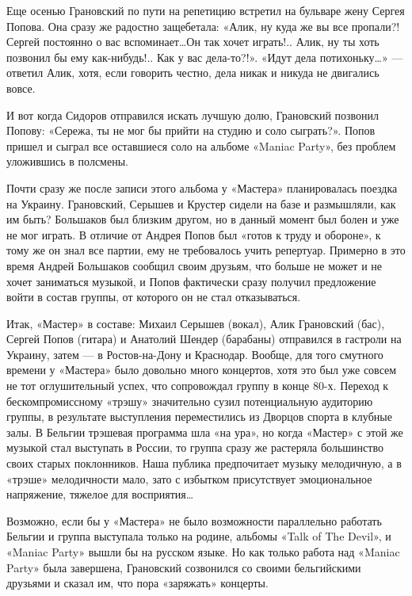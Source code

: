 \documentclass[16pt,a5paper]{book}
\begin{document}
Еще осенью Грановский по пути на репетицию встретил на бульваре жену Сергея Попова. Она сразу же радостно защебетала:
«Алик, ну куда же вы все пропали?! Сергей постоянно о вас вспоминает\ldots Он так хочет играть!.. Алик, ну ты хоть
позвонил бы ему как-нибудь!.. Как у вас дела-то?!». «Идут дела потихоньку\ldots» — ответил Алик, хотя, если говорить
честно, дела никак и никуда не двигались вовсе.

И вот когда Сидоров отправился искать лучшую долю, Грановский позвонил Попову: «Сережа, ты не мог бы прийти на студию и
соло сыграть?». Попов пришел и сыграл все оставшиеся соло на альбоме «Maniac Party», без проблем уложившись в полсмены.

Почти сразу же после записи этого альбома у «Мастера» планировалась поездка на Украину. Грановский, Серышев и Крустер
сидели на базе и размышляли, как им быть? Большаков был близким другом, но в данный момент был болен и уже не мог
играть. В отличие от Андрея Попов был «готов к труду и обороне», к тому же он знал все партии, ему не требовалось учить
репертуар. Примерно в это время Андрей Большаков сообщил своим друзьям, что больше не может и не хочет заниматься
музыкой, и Попов фактически сразу получил предложение войти в состав группы, от которого он не стал отказываться.

Итак, «Мастер» в составе: Михаил Серышев (вокал), Алик Грановский (бас), Сергей Попов (гитара) и Анатолий Шендер
(барабаны) отправился в гастроли на Украину, затем — в Ростов-на-Дону и Краснодар. Вообще, для того смутного времени у
«Мастера» было довольно много концертов, хотя это был уже совсем не тот оглушительный успех, что сопровождал группу в
конце 80-х. Переход к бескомпромиссному «трэшу» значительно сузил потенциальную аудиторию группы, в результате
выступления переместились из Дворцов спорта в клубные залы. В Бельгии трэшевая программа шла «на ура», но когда «Мастер»
с этой же музыкой стал выступать в России, то группа сразу же растеряла большинство своих старых поклонников. Наша
публика предпочитает музыку мелодичную, а в «трэше» мелодичности мало, зато с избытком присутствует эмоциональное
напряжение, тяжелое для восприятия\ldots

Возможно, если бы у «Мастера» не было возможности параллельно работать Бельгии и группа выступала только на родине,
альбомы «Talk of The Devil», и «Maniac Party» вышли бы на русском языке. Но как только работа над «Maniac Party» была
завершена, Грановский созвонился со своими бельгийскими друзьями и сказал им, что пора «заряжать» концерты.
\end{document}
